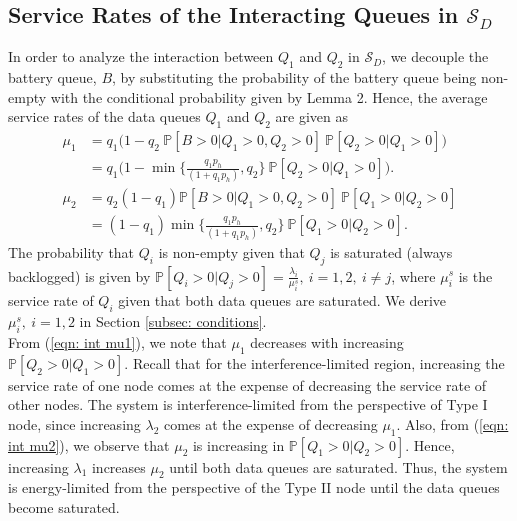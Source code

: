 \documentclass[draftcls,12pt,onecolumn]{IEEEtran}
\begin{document}
\subsection{Service Rates of the Interacting Queues in $\mathcal{S}_D$}
In order to analyze the interaction between $Q_1$ and $Q_2$ in $\mathcal{S}_D$, we decouple the battery queue, $B$, by substituting the probability of the battery queue being non-empty with the conditional probability given by Lemma 2. Hence, the average service rates of the data queues $Q_1$ and $Q_2$ are given as 
\vspace{-0.4in}
\begin{align}
\mu_1 &= q_1 \big(1-q_2 \ \mathbb{P}[B\!>\!0| Q_1\!>\! 0, Q_2\!>\!0]  \ \mathbb{P}[ Q_2\!>\!0| Q_1\!> \!0] \big) \label{eqn: service1 D}\\
&=  q_1 \big( 1- \min \big\lbrace \frac{q_1 p_h}{ (1+ q_1 p_h)}, q_2 \big\rbrace \ \mathbb{P}[ Q_2\!>\!0| Q_1\!> \!0] \big). \label{eqn: int mu1} \\
\mu_2 &= q_2 \left( 1-q_1\right)  \mathbb{P}[B\!>\!0| Q_1\!>\! 0, Q_2\!>\!0]  \ \mathbb{P}[ Q_1\!>\!0| Q_2\!> \!0]   \label{eqn: service2 D}\\
&= (1-q_1) \min \big\lbrace \frac{q_1 p_h}{ (1+ q_1 p_h)}, q_2 \big\rbrace  \ \mathbb{P}[ Q_1\!>\!0| Q_2\!> \!0]. \label{eqn: int mu2}
\end{align}
The probability that $Q_i$ is non-empty given that $Q_j$ is saturated (always backlogged) is given by $\mathbb{P}[ Q_i >0| Q_j > 0]=\frac{\lambda_i}{\mu_i^s}, \ i=1,2, \ i\neq j $, where $\mu_i^s$ is the service rate of $Q_i$ given that both data queues are saturated. We derive $\mu_i^s, \ i=1,2$ in Section \ref{subsec: conditions}.\\
\indent From (\ref{eqn: int mu1}), we note that $\mu_1$ decreases with increasing $\mathbb{P}[ Q_2 >0| Q_1 > 0]$. Recall that for the interference-limited region, increasing the service rate of one node comes at the expense of decreasing the service rate of other nodes. The system is interference-limited from the perspective of Type I node, since increasing $\lambda_2$ comes at the expense of decreasing $\mu_1$. Also, from (\ref{eqn: int mu2}), we observe that $\mu_2$ is increasing in $\mathbb{P}[ Q_1 >0| Q_2 > 0]$.
Hence, increasing $\lambda_1$ increases $\mu_2$ until both data queues are saturated. Thus, the system is energy-limited from the perspective of the Type II node until the data queues become saturated.
\end{document}
